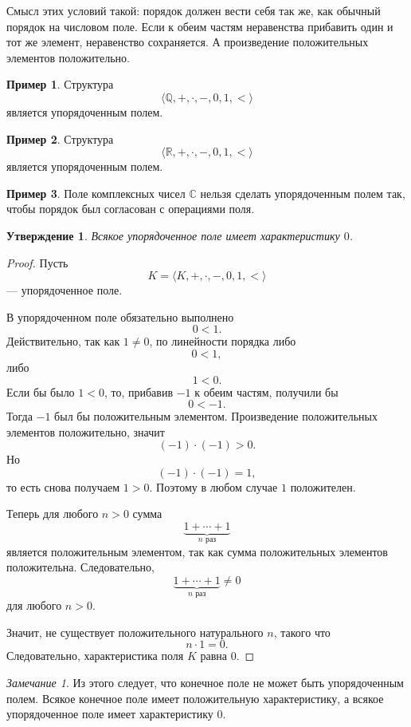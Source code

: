 \documentclass[12pt,a4paper,oneside,openany]{book}
\theoremstyle{definition}
\newtheorem{example}{Пример}[chapter]
\theoremstyle{plain}
\newtheorem{proposition}{Утверждение}[chapter]
\theoremstyle{remark}
\newtheorem{remark}{Замечание}[chapter]
\begin{document}
Смысл этих условий такой: порядок должен вести себя так же, как обычный порядок на числовом поле. Если к обеим частям неравенства прибавить один и тот же элемент, неравенство сохраняется. А произведение положительных элементов положительно.

\begin{example}
Структура
\[
\langle\mathbb Q,+,\cdot,-,0,1,<\rangle
\]
является упорядоченным полем.
\end{example}

\begin{example}
Структура
\[
\langle\mathbb R,+,\cdot,-,0,1,<\rangle
\]
является упорядоченным полем.
\end{example}

\begin{example}
Поле комплексных чисел $\mathbb C$ нельзя сделать упорядоченным полем так, чтобы порядок был согласован с операциями поля.
\end{example}

\begin{proposition}
Всякое упорядоченное поле имеет характеристику $0$.
\end{proposition}

\begin{proof}
Пусть
\[
K=\langle K,+,\cdot,-,0,1,<\rangle
\]
— упорядоченное поле.

В упорядоченном поле обязательно выполнено
\[
0<1.
\]
Действительно, так как $1\ne 0$, по линейности порядка либо
\[
0<1,
\]
либо
\[
1<0.
\]
Если бы было $1<0$, то, прибавив $-1$ к обеим частям, получили бы
\[
0<-1.
\]
Тогда $-1$ был бы положительным элементом. Произведение положительных элементов положительно, значит
\[
(-1)\cdot(-1)>0.
\]
Но
\[
(-1)\cdot(-1)=1,
\]
то есть снова получаем $1>0$. Поэтому в любом случае $1$ положителен.

Теперь для любого $n>0$ сумма
\[
\underbrace{1+\cdots+1}_{n\text{ раз}}
\]
является положительным элементом, так как сумма положительных элементов положительна. Следовательно,
\[
\underbrace{1+\cdots+1}_{n\text{ раз}}\ne 0
\]
для любого $n>0$.

Значит, не существует положительного натурального $n$, такого что
\[
n\cdot 1=0.
\]
Следовательно, характеристика поля $K$ равна $0$.
\end{proof}

\begin{remark}
Из этого следует, что конечное поле не может быть упорядоченным полем. Всякое конечное поле имеет положительную характеристику, а всякое упорядоченное поле имеет характеристику $0$.
\end{remark}
\end{document}
